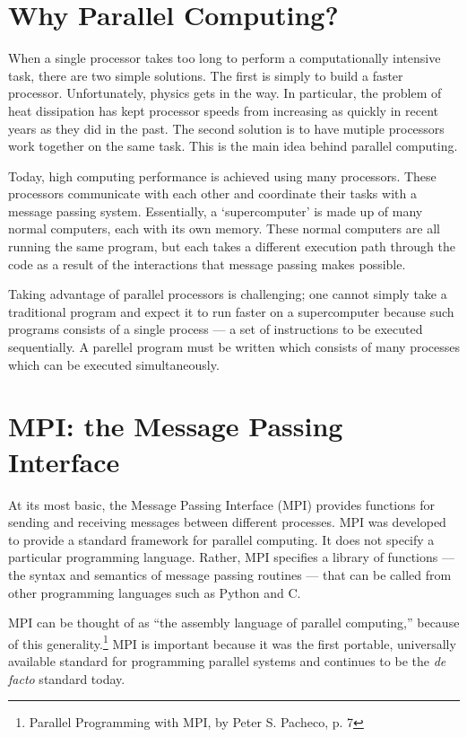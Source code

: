 \label{lab:MPI}

\section*{Why Parallel Computing?}
When a single processor takes too long to perform a computationally intensive task, there are two simple solutions.
The first is simply to build a faster processor.
Unfortunately, physics gets in the way.
In particular, the problem of heat dissipation has kept processor speeds from increasing as quickly in recent years as they did in the past.
The second solution is to have mutiple processors work together on the same task.
This is the main idea behind parallel computing.

Today, high computing performance is achieved using many processors.
These processors communicate with each other and coordinate their tasks with a message passing system. 
Essentially, a `supercomputer' is made up of many normal computers, each with its own memory. 
These normal computers are all running the same program, but each takes a different execution path through the code as a result of the interactions that message passing makes possible.

Taking advantage of parallel processors is challenging; one cannot simply take a traditional program and expect it to run faster on a supercomputer because such programs consists of a single process --- a set of instructions to be executed sequentially.
A parellel program must be written which consists of many processes which can be executed simultaneously.

\section*{MPI: the Message Passing Interface}
At its most basic, the Message Passing Interface (MPI) provides functions for sending 
and receiving messages between different processes. MPI was developed to provide a standard framework for parallel computing. 
It does not specify a particular programming language. 
Rather, MPI specifies a library of functions --- the syntax and semantics of message passing routines --- that can be called from other programming languages such as Python and C.

MPI can be thought of as ``the assembly language of parallel computing,'' because of this 
generality.\footnote{Parallel Programming with MPI, by Peter S. Pacheco, p. 7}
MPI is important because it was the first portable, universally available standard for programming parallel systems and continues to be the \emph{de facto} standard today. 

